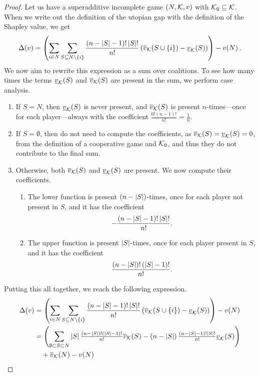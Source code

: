 \begin{proof}
  Let us have a superadditive incomplete game $ \left( N,\mathcal{K},v \right) $ with $ \mathcal{K}_0 \subseteq \mathcal{K} $.
  When we write out the definition of the utopian gap with the definition of the Shapley value, we get \[
    \Delta\!\left(v\right) = \left( \sum_{i \in N}^{} \sum_{S \subseteq N \setminus \left\{ i \right\}} \frac{\left( n - \left\lvert S \right\rvert - 1 \right)! \left\lvert S \right\rvert!}{n!} \left( \overline{v}_{\mathcal{K}}\!\left(S \cup \left\{ i \right\}\right) - \underline{v}_{\mathcal{K}}\!\left(S\right) \right) \right) - v\!\left(N\right).
  \]
  We now aim to rewrite this expression as a sum over coalitions.
  To see how many times the terms $ \underline{v}_{\mathcal{K}}\!\left(S\right) $ and $ \overline{v}_{\mathcal{K}}\!\left(S\right) $ are present in the sum, we perform case analysis.
  \begin{enumerate}
  	\item If $ S = N $, then $ \underline{v}_{\mathcal{K}}\!\left(S\right) $ is never present, and $ \overline{v}_{\mathcal{K}}\!\left(S\right) $ is present $ n $-times---once for each player---always with the coefficient $ \frac{0!\left( n-1 \right)!}{n!} = \frac 1n $.
	\item If $ S = \emptyset $, then do not need to compute the coefficients, as $ \overline{v}_{\mathcal{K}}\!\left(S\right) = \underline{v}_{\mathcal{K}}\!\left(S\right) = 0 $, from the definition of a cooperative game and $ \mathcal{K}_0 $, and thus they do not contribute to the final sum.
	\item Otherwise, both $ \overline{v}_{\mathcal{K}}\!\left(S\right) $ and $ \underline{v}_{\mathcal{K}}\!\left(S\right) $ are present.
	  We now compute their coefficients.
	  \begin{enumerate}[ ]
	  	\item The lower function is present $ \left( n-\left\lvert S \right\rvert \right) $-times, once for each player not present in $ S $, and it has the coefficient \[
	  		-\frac{\left( n-\left\lvert S \right\rvert-1 \right)! \left\lvert S \right\rvert!}{n!}.
	  	\]
	  	\item The upper function is present $ \left\lvert S \right\rvert $-times, once for each player present in $ S $, and it has the coefficient \[
	  		\frac{\left( n-\left\lvert S \right\rvert \right)! \left( \left\lvert S \right\rvert-1 \right)!}{n!}.
	  	\]
	  \end{enumerate}
  \end{enumerate}
  Putting this all together, we reach the following expression. \begin{align*}
    \gap v &=  \left( \sum_{i \in N}^{} \sum_{S \subseteq N \setminus \left\{ i \right\}} \frac{\left( n - \absolute{S} - 1 \right)! \absolute{S}!}{n!} \left( \fce{\uf v}{S \cup \left\{ i \right\}} - \fce{\lf v}{S} \right) \right) - \fce{v}{N} \\
	   &=  \left( \sum_{\emptyset \subset S \subset N}^{} \absolute{S}\tfrac{\left( n-\absolute{S} \right)! \left( \absolute{S}-1 \right)!}{n!} \fce{\uf v}{S} - \left( n-\absolute{S} \right)\tfrac{\left( n-\absolute{S}-1 \right)! \absolute{S}!}{n!} \fce{\lf v}{S} \right) \\ &\quad+ \fce{\uf v}{N} - \fce{v}{N} \\

\end{align*}
\end{proof}
